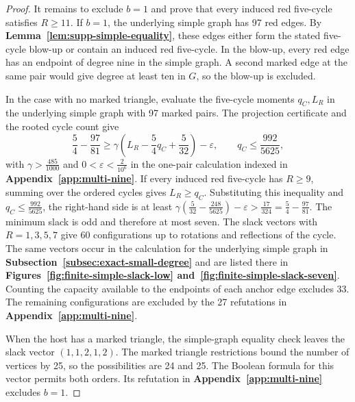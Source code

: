 \documentclass[preprint,11pt,numbers]{elsarticle-arxiv}
\numberwithin{equation}{section}
\theoremstyle{definition}
\begin{document}
\begin{proof}
It remains to exclude $b=1$ and prove that every induced red
five-cycle satisfies $R\ge11$. If $b=1$, the underlying simple
graph has 97 red edges. By \textbf{Lemma~\ref{lem:supp-simple-equality}},
these edges either form the stated five-cycle blow-up or contain
an induced red five-cycle. In the blow-up, every red edge has
an endpoint of degree nine in the simple graph. A second
marked edge at the same pair would give degree at least
ten in $G$, so the blow-up is excluded.

In the case with no marked triangle, evaluate the five-cycle moments
$q_C,L_R$ in the underlying simple graph with 97 marked pairs. The projection
certificate and the rooted cycle count give
\[
 \frac54-\frac{97}{81}\geq
 \gamma\left(L_R-\frac54 q_C+\frac5{32}\right)-\varepsilon,
 \qquad q_C\leq\frac{992}{5625},
\]
with $\gamma>\frac{485}{1000}$ and $0<\varepsilon<\frac{2}{10^6}$
in the one-pair calculation indexed in \textbf{Appendix~\ref{app:multi-nine}}.
If every induced red five-cycle has $R\ge9$, summing over the
ordered cycles gives $L_R\ge q_C$. Substituting this inequality
and $q_C\le\frac{992}{5625}$, the right-hand side is at least
$\gamma(\frac5{32}-\frac{248}{5625})-\varepsilon>
\frac{17}{324}=\frac54-\frac{97}{81}$.
The minimum slack is odd and therefore at most seven. The slack
vectors with $R=1,3,5,7$ give 60 configurations up to
rotations and reflections of the cycle. The same vectors occur in the
calculation for the underlying simple graph in \textbf{Subsection~\ref{subsec:exact-small-degree}}
and are listed there in \textbf{Figures~\ref{fig:finite-simple-slack-low}
and~\ref{fig:finite-simple-slack-seven}}. Counting the
capacity available to the endpoints of each anchor edge
excludes 33. The remaining configurations are excluded by the
27 refutations in \textbf{Appendix~\ref{app:multi-nine}}.

When the host has a marked triangle, the simple-graph
equality check leaves the slack vector $(1,1,2,1,2)$.
The marked triangle restrictions bound the number of
vertices by 25, so the possibilities are 24 and 25.
The Boolean formula for this vector permits both orders. Its
refutation in \textbf{Appendix~\ref{app:multi-nine}} excludes $b=1$.


\end{proof}
\end{document}
